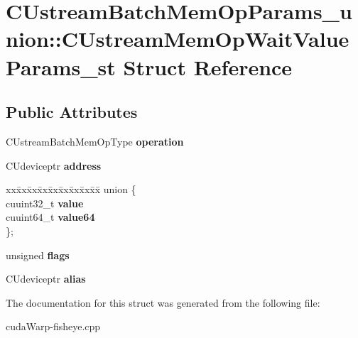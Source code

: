 \hypertarget{structCUstreamBatchMemOpParams__union_1_1CUstreamMemOpWaitValueParams__st}{}\section{C\+Ustream\+Batch\+Mem\+Op\+Params\+\_\+union\+:\+:C\+Ustream\+Mem\+Op\+Wait\+Value\+Params\+\_\+st Struct Reference}
\label{structCUstreamBatchMemOpParams__union_1_1CUstreamMemOpWaitValueParams__st}
\subsection*{Public Attributes}
\begin{DoxyCompactItemize}
\item 
C\+Ustream\+Batch\+Mem\+Op\+Type {\bfseries operation}\hypertarget{structCUstreamBatchMemOpParams__union_1_1CUstreamMemOpWaitValueParams__st_a7d0f1b1f094227faeaa34a640134d062}{}\label{structCUstreamBatchMemOpParams__union_1_1CUstreamMemOpWaitValueParams__st_a7d0f1b1f094227faeaa34a640134d062}

\item 
C\+Udeviceptr {\bfseries address}\hypertarget{structCUstreamBatchMemOpParams__union_1_1CUstreamMemOpWaitValueParams__st_a9b23cb31c0e662d9e911df06f651529c}{}\label{structCUstreamBatchMemOpParams__union_1_1CUstreamMemOpWaitValueParams__st_a9b23cb31c0e662d9e911df06f651529c}

\item 
\begin{tabbing}
xx\=xx\=xx\=xx\=xx\=xx\=xx\=xx\=xx\=\kill
union \{\\
\>cuuint32\_t {\bfseries value}\\
\>cuuint64\_t {\bfseries value64}\\
\}; \hypertarget{structCUstreamBatchMemOpParams__union_1_1CUstreamMemOpWaitValueParams__st_ac94e9774c6d5e08fbdc154ab328d8d8b}{}\label{structCUstreamBatchMemOpParams__union_1_1CUstreamMemOpWaitValueParams__st_ac94e9774c6d5e08fbdc154ab328d8d8b}
\\

\end{tabbing}\item 
unsigned {\bfseries flags}\hypertarget{structCUstreamBatchMemOpParams__union_1_1CUstreamMemOpWaitValueParams__st_abbb37ebea230524f9d635e58ba40d673}{}\label{structCUstreamBatchMemOpParams__union_1_1CUstreamMemOpWaitValueParams__st_abbb37ebea230524f9d635e58ba40d673}

\item 
C\+Udeviceptr {\bfseries alias}\hypertarget{structCUstreamBatchMemOpParams__union_1_1CUstreamMemOpWaitValueParams__st_a28c68cc5ca7383af4040c193e2544836}{}\label{structCUstreamBatchMemOpParams__union_1_1CUstreamMemOpWaitValueParams__st_a28c68cc5ca7383af4040c193e2544836}

\end{DoxyCompactItemize}


The documentation for this struct was generated from the following file\+:\begin{DoxyCompactItemize}
\item 
cuda\+Warp-\/fisheye.\+cpp\end{DoxyCompactItemize}
